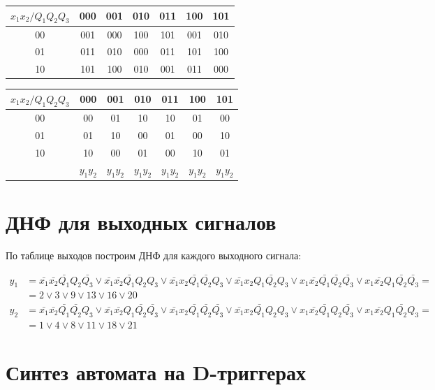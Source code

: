 \documentclass[listings]{labreport}
\begin{document}
\begin{tabular}{|*{7}{c|}}
\hline
$x_1x_2/Q_1Q_2Q_3$ & 000 & 001 & 010 & 011 & 100 & 101\\\hline
00 & 001 & 000 & 100 & 101 & 001 & 010\\\hline
01 & 011 & 010 & 000 & 011 & 101 & 100\\\hline
10 & 101 & 100 & 010 & 001 & 011 & 000\\\hline
\end{tabular}

\begin{tabular}{|*{7}{c|}}
\hline
$x_1x_2/Q_1Q_2Q_3$ & 000 & 001 & 010 & 011 & 100 & 101\\\hline
00 & 00 & 01 & 10 & 10 & 01 & 00\\\hline
01 & 01 & 10 & 00 & 01 & 00 & 10\\\hline
10 & 10 & 00 & 01 & 00 & 10 & 01\\\hline
 & $y_1y_2$ & $y_1y_2$ & $y_1y_2$ & $y_1y_2$ & $y_1y_2$ & $y_1y_2$\\\hline
\end{tabular}

\section*{ДНФ для выходных сигналов}

По таблице выходов построим ДНФ для каждого выходного сигнала:

\begin{align*}
y_1 & = \bar{x_1}\bar{x_2}\bar{Q_1}Q_2\bar{Q_3} \lor \bar{x_1}\bar{x_2}\bar{Q_1}Q_2Q_3 \lor \bar{x_1}x_2\bar{Q_1}\bar{Q_2}Q_3 \lor \bar{x_1}x_2Q_1\bar{Q_2}Q_3 \lor x_1\bar{x_2}\bar{Q_1}\bar{Q_2}\bar{Q_3} \lor x_1\bar{x_2}Q_1\bar{Q_2}\bar{Q_3} = \\ & = 2 \lor 3 \lor 9 \lor 13 \lor 16 \lor 20 \\
y_2 & = \bar{x_1}\bar{x_2}\bar{Q_1}\bar{Q_2}Q_3 \lor \bar{x_1}\bar{x_2}Q_1\bar{Q_2}\bar{Q_3} \lor \bar{x_1}x_2\bar{Q_1}\bar{Q_2}\bar{Q_3} \lor \bar{x_1}x_2\bar{Q_1}Q_2Q_3 \lor x_1\bar{x_2}\bar{Q_1}Q_2\bar{Q_3} \lor x_1\bar{x_2}Q_1\bar{Q_2}Q_3 = \\ & = 1 \lor 4 \lor 8 \lor 11 \lor 18 \lor 21
\end{align*}

\newpage
\section*{Синтез автомата на D-триггерах}
\end{document}
